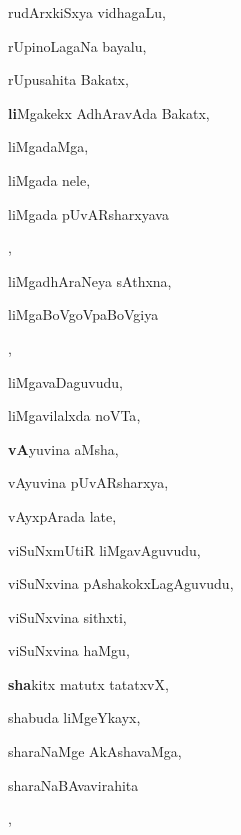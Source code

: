\begin{multicols}{3}
{\noindent
{rudArxkiSxya vidhagaLu}, \pageref{rudArxkiSxya vidhagaLu}

\noindent
{rUpinoLagaNa bayalu}, \pageref{rUpinoLagaNa bayalu}

\noindent
{rUpusahita Bakatx}, \pageref{rUpusahita Bakatx}

\noindent
{{\large\textbf{li}}Mgakekx AdhAravAda Bakatx}, \pageref{liMgakekx AdhAravAda Bakatx}

\noindent
{liMgadaMga}, \pageref{liMgadaMga}

\noindent
{liMgada nele}, \pageref{liMgada nele}

\noindent
{liMgada pUvARsharxyava}

\noindent
{}, \pageref{liMgada pUvARsharxyava kaLeyuvudu}

\noindent
{liMgadhAraNeya sAthxna}, \pageref{liMgadhAraNeya sAthxna}

\noindent
{liMgaBoVgoVpaBoVgiya}

\noindent
{}, \pageref{liMgaBoVgoVpaBoVgiya saMgasuKa}

\noindent
{liMgavaDaguvudu}, \pageref{liMgavaDaguvudu}

\noindent
{liMgavilalxda noVTa}, \pageref{liMgavilalxda noVTa}

\noindent
{{\large\textbf{vA}}yuvina aMsha}, \pageref{vAyuvina aMsha}

\noindent
{vAyuvina pUvARsharxya}, \pageref{vAyuvina pUvARsharxya}

\noindent
{vAyxpArada late}, \pageref{vAyxpArada late}

\noindent
{viSuNxmUtiR liMgavAguvudu}, \pageref{viSuNxmUtiR liMgavAguvudu}

\noindent
{viSuNxvina pAshakokxLagAguvudu}, \pageref{viSuNxvina pAshakokxLagAguvudu}

\noindent
{viSuNxvina sithxti}, \pageref{viSuNxvina sithxti}

\noindent
{viSuNxvina haMgu}, \pageref{viSuNxvina haMgu}

\noindent
{{\large\textbf{sha}}kitx matutx tatatxvX}, \pageref{shakitx matutx tatatxvX}

\noindent
{shabuda liMgeYkayx}, \pageref{shabuda liMgeYkayx}

\noindent
{sharaNaMge AkAshavaMga}, \pageref{sharaNaMge AkAshavaMga}

\noindent
{sharaNaBAvavirahita}

\noindent
{}, \pageref{sharaNaBAvavirahita samayxgfjAcnxni}

}
\end{multicols}
